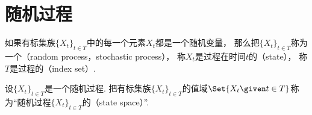 \section{随机过程}
\begin{definition}
如果有标集族\(\{X_t\}_{t \in T}\)中的每一个元素\(X_t\)都是一个随机变量，
那么把\(\{X_t\}_{t \in T}\)称为一个（random process，stochastic process），
称\(X_t\)是过程在时间\(t\)的（state），
称\(T\)是过程的（index set）.
\end{definition}

\begin{definition}
设\(\{X_t\}_{t \in T}\)是一个随机过程.
把有标集族\(\{X_t\}_{t \in T}\)的值域\(
	\Set{
		X_t
		\given
		t \in T
	}
\)称为“随机过程\(\{X_t\}_{t \in T}\)的（state space）”.
\end{definition}
